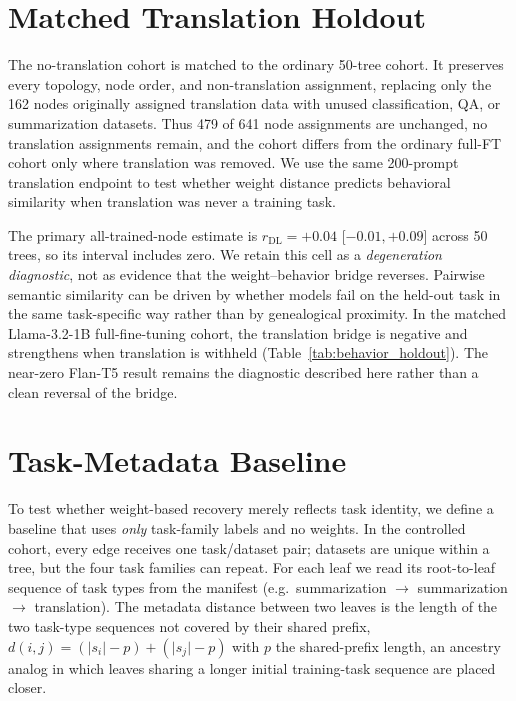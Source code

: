 \documentclass{article}
\theoremstyle{definition}
\theoremstyle{plain}
\begin{document}
\section{Matched Translation Holdout}
\label{app:translation_probe}

The no-translation cohort is matched to the ordinary 50-tree cohort. It
preserves every topology, node order, and non-translation assignment, replacing only the 162 nodes
originally assigned translation data with unused classification, QA, or summarization datasets. Thus
479 of 641 node assignments are unchanged, no translation assignments remain, and the cohort differs
from the ordinary full-FT cohort only where translation was removed. We use the same 200-prompt
translation endpoint to test whether weight distance predicts behavioral similarity when translation
was never a training task.

The primary all-trained-node estimate is
$r_{\mathrm{DL}}=+0.04$ [$-0.01,+0.09$] across 50 trees, so its interval includes zero. We retain this
cell as a \emph{degeneration diagnostic}, not as evidence that the weight--behavior bridge reverses.
Pairwise semantic similarity can be driven by whether models fail on the held-out task in the same
task-specific way rather than by genealogical proximity. In the matched Llama-3.2-1B
full-fine-tuning cohort, the translation bridge is negative and
strengthens when translation is withheld (Table~\ref{tab:behavior_holdout}). The near-zero Flan-T5
result remains the diagnostic described here rather than a clean reversal of the bridge.


\section{Task-Metadata Baseline}
\label{app:taskbaseline}

To test whether weight-based recovery merely reflects task identity, we define a baseline that uses
\emph{only} task-family labels and no weights. In the controlled cohort, every edge receives one
task/dataset pair; datasets are unique within a tree, but the four task families can repeat. For each
leaf we read its root-to-leaf sequence of task types from the manifest (e.g.\ summarization $\to$
summarization $\to$ translation). The metadata distance between two leaves is the length of the two
task-type sequences not covered by their shared prefix, $d(i,j)=(\lvert s_i\rvert-p)+(\lvert
s_j\rvert-p)$ with $p$ the shared-prefix length, an ancestry analog in which leaves sharing a longer
initial training-task sequence are placed closer.
\end{document}
